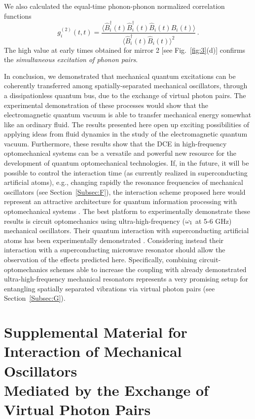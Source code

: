 \documentclass[aps,pra,twocolumn,floatfix,longbibliography, superscriptaddress]{revtex4-1}
\newcommand{\be}{\begin{equation}}
\newcommand{\ee}{\end{equation}}
\begin{document}
We also calculated the equal-time phonon-phonon normalized correlation functions 
\be
g_i^{(2)}(t,t) = \frac{\langle \hat B_i^\dag(t) \hat B_i^\dag(t) \hat B_i^{}(t) \hat  B_i^{}(t) \rangle}{\langle \hat  B_i^\dag(t) \hat  B_i^{}(t) \rangle^2 }\, .
\ee
The high value at early times obtained for mirror 2 [see Fig.~\ref{fig:3}(d)] confirms the {\it simultaneous excitation of phonon pairs}.

In conclusion, we demonstrated that mechanical quantum excitations can be coherently transferred among spatially-separated mechanical oscillators, through a dissipationless quantum bus, due to the exchange of virtual photon pairs. 
The experimental demonstration of these processes would show that the electromagnetic quantum vacuum is able to transfer mechanical energy somewhat like an ordinary fluid.  
The results presented here open up  exciting possibilities of applying ideas from fluid dynamics in the study of the electromagnetic quantum vacuum. 
Furthermore, these results show that the DCE in high-frequency optomechanical systems can be a versatile and powerful new resource for the development of quantum optomechanical technologies. If, in the future, it will be possible to control the interaction time (as currently realized in superconducting artificial atoms), e.g., changing rapidly the resonance frequencies of mechanical oscillators (see Section~\ref{Subsec:F}), the interaction scheme  proposed here would represent an attractive architecture for quantum information processing with optomechanical systems \cite{Stannigel2012}.
The best platform to experimentally demonstrate these results is circuit optomechanics using ultra-high-frequency ($\omega_{\rm 1}$ at 5-6 GHz) mechanical oscillators. Their quantum interaction with superconducting artificial atoms has been experimentally demonstrated \cite{OConnell2010, Rouxinol2016}. Considering instead their interaction with 
a superconducting microwave resonator should allow the observation of the effects predicted here. Specifically, combining circuit-optomechanics schemes able to increase the coupling \cite{Heikkila2014,Pirkkalainen2015} with already demonstrated ultra-high-frequency mechanical resonators \cite{OConnell2010, Rouxinol2016} represents a very promising setup for entangling spatially separated vibrations via virtual photon pairs (see Section~\ref{Subsec:G}).






\section
{\bf Supplemental Material for\\Interaction of Mechanical Oscillators \\ Mediated  by  the Exchange of Virtual Photon Pairs}
\end{document}
